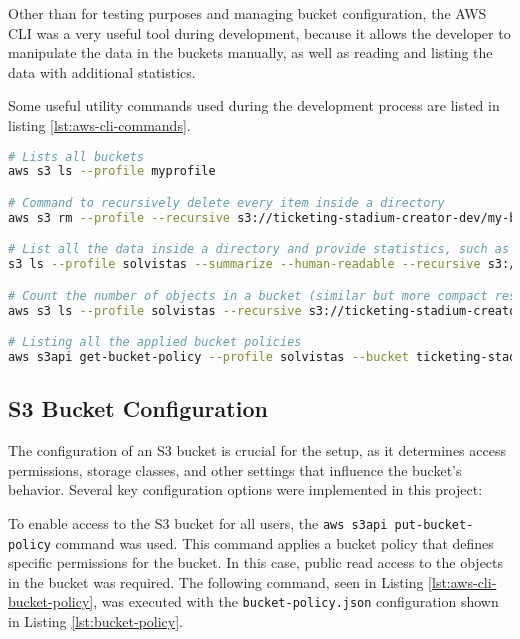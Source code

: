 Other than for testing purposes and managing bucket configuration, the AWS CLI was a very useful tool during development, because it allows the developer to manipulate the data in the buckets manually, as well as reading and listing the data with additional statistics.

Some useful utility commands used during the development process are listed in listing \ref{lst:aws-cli-commands}.

\begin{lstlisting}[language=bash, caption={Useful AWS CLI Commands}, label={lst:aws-cli-commands}]
# Lists all buckets
aws s3 ls --profile myprofile

# Command to recursively delete every item inside a directory
aws s3 rm --profile --recursive s3://ticketing-stadium-creator-dev/my-bucket/

# List all the data inside a directory and provide statistics, such as file size, object count, and total file size
s3 ls --profile solvistas --summarize --human-readable --recursive s3://ticketing-stadium-creator-dev/my-bucket

# Count the number of objects in a bucket (similar but more compact results than in the previous command)
aws s3 ls --profile solvistas --recursive s3://ticketing-stadium-creator-dev/ | wc -l

# Listing all the applied bucket policies
aws s3api get-bucket-policy --profile solvistas --bucket ticketing-stadium-creator-dev

\end{lstlisting}

\subsection{S3 Bucket Configuration}
The configuration of an S3 bucket is crucial for the setup, as it determines access permissions, storage classes, and other settings that influence the bucket’s behavior. Several key configuration options were implemented in this project:

To enable access to the S3 bucket for all users, the \texttt{aws s3api put-bucket-policy} command was used. This command applies a bucket policy that defines specific permissions for the bucket. In this case, public read access to the objects in the bucket was required. The following command, seen in Listing \ref{lst:aws-cli-bucket-policy}, was executed with the \texttt{bucket-policy.json} configuration shown in Listing \ref{lst:bucket-policy}.

